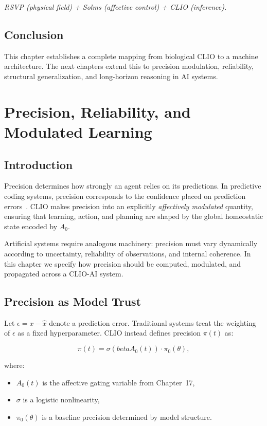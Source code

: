 \documentclass[12pt,oneside]{book}
\theoremstyle{plain}
\theoremstyle{definition}
\let\citep\parencite
\def\beta{beta}%
\begin{document}
\begin{center}
    \textit{RSVP (physical field) + Solms (affective control) + CLIO (inference).}
\end{center}

\section{Conclusion}

This chapter establishes a complete mapping from biological CLIO to a
machine architecture.
The next chapters extend this to precision modulation, reliability, structural
generalization, and long-horizon reasoning in AI systems.

\chapter{Precision, Reliability, and Modulated Learning}

\section{Introduction}

Precision determines how strongly an agent relies on its predictions.
In predictive coding systems, precision corresponds to the confidence placed on
prediction errors~\citep{friston2010free}.
CLIO makes precision into an explicitly \emph{affectively modulated} quantity,
ensuring that learning, action, and planning are shaped by the global
homeostatic state encoded by $A_0$.

Artificial systems require analogous machinery:
precision must vary dynamically according to uncertainty, reliability of
observations, and internal coherence.
In this chapter we specify how precision should be computed, modulated, and
propagated across a CLIO-AI system.

\section{Precision as Model Trust}

Let $\epsilon = x - \hat{x}$ denote a prediction error.
Traditional systems treat the weighting of $\epsilon$ as a fixed hyperparameter.
CLIO instead defines precision $\pi(t)$ as:

\[
\pi(t) = \sigma(\beta A_0(t)) \cdot \pi_0(\theta),
\]

where:

\begin{itemize}
    \item $A_0(t)$ is the affective gating variable from Chapter~17,
    \item $\sigma$ is a logistic nonlinearity,
    \item $\pi_0(\theta)$ is a baseline precision determined by model structure.
\end{itemize}
\end{document}
